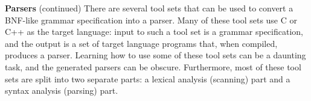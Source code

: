 \begin{minipage}[t]{\sw}
\slidenumber
\LARGE
{\bf Parsers} (continued)\exx
\emm{\Large\LightBox{\MYlon}}\exx
There are several tool sets that can be used
to convert a BNF-like grammar specification 
into a parser.
Many of these tool sets use C or C++ as the target language:
input to such a tool set is a grammar specification,
and the output is a set of target language programs
that, when compiled, produces a parser.
Learning how to use some of these tool sets can be a daunting task,
and the generated parsers can be obscure.
Furthermore, most of these tool sets are split
into two separate parts:
a lexical analysis (scanning) part and a syntax analysis (parsing) part.\exx
\end{minipage}
\clearpage
